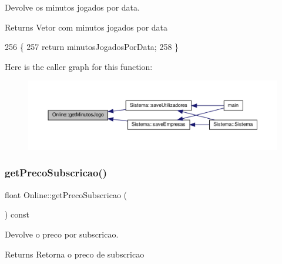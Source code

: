 Devolve os minutos jogados por data. 

\begin{DoxyReturn}{Returns}
Vetor com minutos jogados por data 
\end{DoxyReturn}

\begin{DoxyCode}
256                                                     \{
257     \textcolor{keywordflow}{return} minutosJogadosPorData;
258 \}
\end{DoxyCode}
Here is the caller graph for this function\+:
\nopagebreak
\begin{figure}[H]
\begin{center}
\leavevmode
\includegraphics[width=350pt]{classOnline_a4ab18dfdaa0af23cda8f5268a9968887_icgraph}
\end{center}
\end{figure}
\mbox{\label{classOnline_a0f7240aa5582e10579d0719e4fa5d705}} 
\subsubsection{\texorpdfstring{get\+Preco\+Subscricao()}{getPrecoSubscricao()}}
{\footnotesize\ttfamily float Online\+::get\+Preco\+Subscricao (\begin{DoxyParamCaption}{ }\end{DoxyParamCaption}) const}



Devolve o preco por subscricao. 

\begin{DoxyReturn}{Returns}
Retorna o preco de subscricao 
\end{DoxyReturn}

